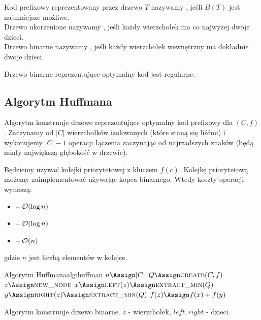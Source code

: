 Kod prefixowy reprezentowany przez drzewo $T$ nazywamy , jeśli $B(T)$ jest najmniejsze możliwe. \\
Drzewo ukorzenione nazywamy , jeśli każdy wierzchołek ma co najwyżej dwoje dzieci. \\
Drzewo binarne nazywamy , jeśli każdy wierzchołek wewnętrzny ma dokładnie dwoje dzieci.

\begin{theorem}
	Drzewo binarne reprezentujące optymalny kod jest regularne.
\end{theorem}

\subsection{Algorytm Huffmana}

Algorytm konstruuje drzewo reprezentujące optymalny kod prefixowy dla $(C, f)$.
Zaczynamy od $|C|$ wierzchołków izolowanych (które staną się liśćmi) i wykonujemy $|C|-1$ operacji łączenia zaczynając od najrzadszych znaków (będą miały największą głębokość w drzewie).

Będziemy używać kolejki priorytetowej z kluczem $f(c)$. Kolejkę priorytetową możemy zaimplementować używając kopca binarnego. Wtedy koszty operacji wynoszą:
\begin{itemize}[nosep]
	\item {} -- $\mathcal{O}(\log n)$
	\item {} -- $\mathcal{O}(\log n)$
	\item {} -- $\mathcal{O}(n)$
\end{itemize}
gdzie $n$ jest liczbą elementów w kolejce.

\begin{alg}{Algorytm Huffmana}{alg:huffman}
	\State $n \Assign |C|$
	\State $Q \Assign \Call{create}{C, f}$ 
	\State $z \Assign \Call{new\_node}{}$
	\State $x \Assign \Call{left}{z} \Assign \Call{extract\_min}{Q}$
	\State $y \Assign \Call{right}{z} \Assign \Call{extract\_min}{Q}$
	\State $f(z) \Assign f(x) + f(y)$
	\State {}
	\EndFor
	\State \Return {}
	\EndFunction
\end{alg}
Algorytm konstruuje drzewo binarne. $z$ - wierzchołek, $left, right$ - dzieci.

